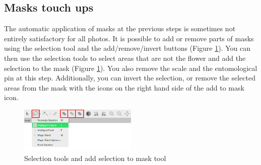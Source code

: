 \documentclass[10pt,letter,english]{article}
\begin{document}




\subsection{Masks touch ups}

The automatic application of masks at the previous steps is sometimes not entirely satisfactory for all photos. It is possible to add or remove parts of masks using the selection tool and the add/remove/invert buttons (Figure \ref{tools_masks}).
You can then use the selection tools to select areas that are not the flower and add the selection to the mask (Figure \ref{tools_masks}). You also remove the scale and the entomological pin at this step.
Additionally, you can invert the selection, or remove the selected areas from the mask with the icons on the right hand side of the add to mask icon.



\begin{figure}[H]
  \centering
  \includegraphics[width=0.5\textwidth]{Figures/tools_masks.png}
  \caption{Selection tools and add selection to mask tool}
  \label{tools_masks}
\end{figure}


\end{document}
